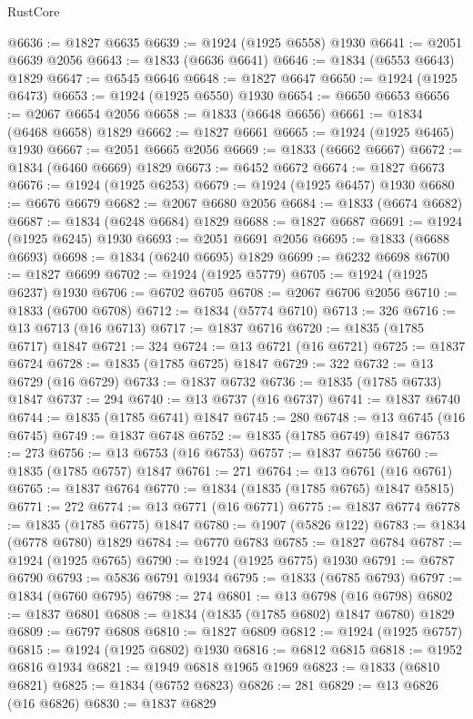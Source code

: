 \begin{lexlean}{RustCore}
\begin{coremodule}
@6636 := @1827 @6635
@6639 := @1924 (@1925 @6558) @1930
@6641 := @2051 @6639 @2056
@6643 := @1833 (@6636 @6641)
@6646 := @1834 (@6553 @6643) @1829
@6647 := @6545 @6646
@6648 := @1827 @6647
@6650 := @1924 (@1925 @6473)
@6653 := @1924 (@1925 @6550) @1930
@6654 := @6650 @6653
@6656 := @2067 @6654 @2056
@6658 := @1833 (@6648 @6656)
@6661 := @1834 (@6468 @6658) @1829
@6662 := @1827 @6661
@6665 := @1924 (@1925 @6465) @1930
@6667 := @2051 @6665 @2056
@6669 := @1833 (@6662 @6667)
@6672 := @1834 (@6460 @6669) @1829
@6673 := @6452 @6672
@6674 := @1827 @6673
@6676 := @1924 (@1925 @6253)
@6679 := @1924 (@1925 @6457) @1930
@6680 := @6676 @6679
@6682 := @2067 @6680 @2056
@6684 := @1833 (@6674 @6682)
@6687 := @1834 (@6248 @6684) @1829
@6688 := @1827 @6687
@6691 := @1924 (@1925 @6245) @1930
@6693 := @2051 @6691 @2056
@6695 := @1833 (@6688 @6693)
@6698 := @1834 (@6240 @6695) @1829
@6699 := @6232 @6698
@6700 := @1827 @6699
@6702 := @1924 (@1925 @5779)
@6705 := @1924 (@1925 @6237) @1930
@6706 := @6702 @6705
@6708 := @2067 @6706 @2056
@6710 := @1833 (@6700 @6708)
@6712 := @1834 (@5774 @6710)
@6713 := 326
@6716 := @13 @6713 (@16 @6713)
@6717 := @1837 @6716
@6720 := @1835 (@1785 @6717) @1847
@6721 := 324
@6724 := @13 @6721 (@16 @6721)
@6725 := @1837 @6724
@6728 := @1835 (@1785 @6725) @1847
@6729 := 322
@6732 := @13 @6729 (@16 @6729)
@6733 := @1837 @6732
@6736 := @1835 (@1785 @6733) @1847
@6737 := 294
@6740 := @13 @6737 (@16 @6737)
@6741 := @1837 @6740
@6744 := @1835 (@1785 @6741) @1847
@6745 := 280
@6748 := @13 @6745 (@16 @6745)
@6749 := @1837 @6748
@6752 := @1835 (@1785 @6749) @1847
@6753 := 273
@6756 := @13 @6753 (@16 @6753)
@6757 := @1837 @6756
@6760 := @1835 (@1785 @6757) @1847
@6761 := 271
@6764 := @13 @6761 (@16 @6761)
@6765 := @1837 @6764
@6770 := @1834 (@1835 (@1785 @6765) @1847 @5815)
@6771 := 272
@6774 := @13 @6771 (@16 @6771)
@6775 := @1837 @6774
@6778 := @1835 (@1785 @6775) @1847
@6780 := @1907 (@5826 @122)
@6783 := @1834 (@6778 @6780) @1829
@6784 := @6770 @6783
@6785 := @1827 @6784
@6787 := @1924 (@1925 @6765)
@6790 := @1924 (@1925 @6775) @1930
@6791 := @6787 @6790
@6793 := @5836 @6791 @1934
@6795 := @1833 (@6785 @6793)
@6797 := @1834 (@6760 @6795)
@6798 := 274
@6801 := @13 @6798 (@16 @6798)
@6802 := @1837 @6801
@6808 := @1834 (@1835 (@1785 @6802) @1847 @6780) @1829
@6809 := @6797 @6808
@6810 := @1827 @6809
@6812 := @1924 (@1925 @6757)
@6815 := @1924 (@1925 @6802) @1930
@6816 := @6812 @6815
@6818 := @1952 @6816 @1934
@6821 := @1949 @6818 @1965 @1969
@6823 := @1833 (@6810 @6821)
@6825 := @1834 (@6752 @6823)
@6826 := 281
@6829 := @13 @6826 (@16 @6826)
@6830 := @1837 @6829

\end{coremodule}
\end{lexlean}
